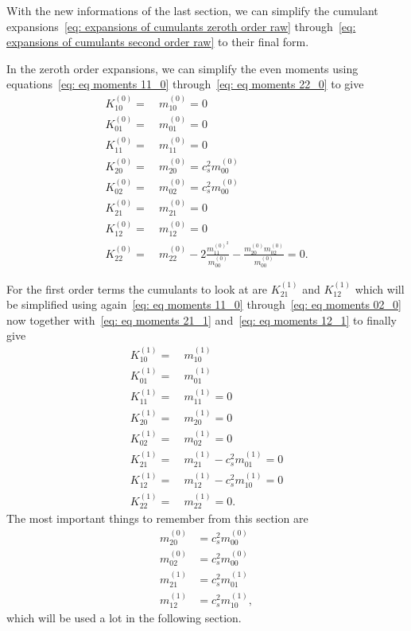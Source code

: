With the new informations of the last section, we can simplify the cumulant expansions~\eqref{eq: expansions of cumulants zeroth order raw} through~\eqref{eq: expansions of cumulants second order raw} to their final form.

In the zeroth order expansions, we can simplify the even moments using equations~\eqref{eq: eq moments 11_0} through~\eqref{eq: eq moments 22_0} to give
\begin{equation}
  \label{eq: expansions of cumulants zeroth order}
  \begin{aligned}
    K_{10}^{(0)} =&\ m_{10}^{(0)} = 0\\
    K_{01}^{(0)} =&\ m_{01}^{(0)} = 0\\
    K_{11}^{(0)} =&\ m_{11}^{(0)} = 0\\
    K_{20}^{(0)} =&\ m_{20}^{(0)} = c_s^2 m_{00}^{(0)}\\
    K_{02}^{(0)} =&\ m_{02}^{(0)} = c_s^2 m_{00}^{(0)}\\
    K_{21}^{(0)} =&\ m_{21}^{(0)} = 0\\
    K_{12}^{(0)} =&\ m_{12}^{(0)} = 0\\
    K_{22}^{(0)} =&\ m_{22}^{(0)}
    - 2\frac{ m_{11}^{{(0)}^2}}{m_{00}^{(0)}}
    - \frac{ m_{20}^{(0)} m_{02}^{(0)} }{m_{00}^{(0)}}
    = 0.
  \end{aligned}
\end{equation}

For the first order terms the cumulants to look at are $K_{21}^{(1)}$ and $K_{12}^{(1)}$ which will be simplified using
again~\eqref{eq: eq moments 11_0} through~\eqref{eq: eq moments 02_0}
now together with~\eqref{eq: eq moments 21_1} and~\eqref{eq: eq moments 12_1} to finally give
\begin{equation}
  \label{eq: expansions of cumulants first order}
  \begin{aligned}
    K_{10}^{(1)} =&\ m_{10}^{(1)}\\
    K_{01}^{(1)} =&\ m_{01}^{(1)}\\
    K_{11}^{(1)} =&\ m_{11}^{(1)} = 0 \\
    K_{20}^{(1)} =&\ m_{20}^{(1)} = 0\\
    K_{02}^{(1)} =&\ m_{02}^{(1)} = 0\\
    K_{21}^{(1)} =&\ m_{21}^{(1)}
    - c_s^2 m_{01}^{(1)} = 0 \\
    K_{12}^{(1)} =&\ m_{12}^{(1)}
    - c_s^2 m_{10}^{(1)} = 0 \\
    K_{22}^{(1)} =&\ m_{22}^{(1)} = 0.
  \end{aligned}
\end{equation}
The most important things to remember from this section are
\begin{equation}
  \label{eq: aliasing all}
  \begin{aligned}
    m_{20}^{(0)} &= c_s^2 m_{00}^{(0)} \\
    m_{02}^{(0)} &= c_s^2 m_{00}^{(0)} \\
    m_{21}^{(1)} &= c_s^2 m_{01}^{(1)} \\
    m_{12}^{(1)} &= c_s^2 m_{10}^{(1)},
  \end{aligned}
\end{equation}
which will be used a lot in the following section.

